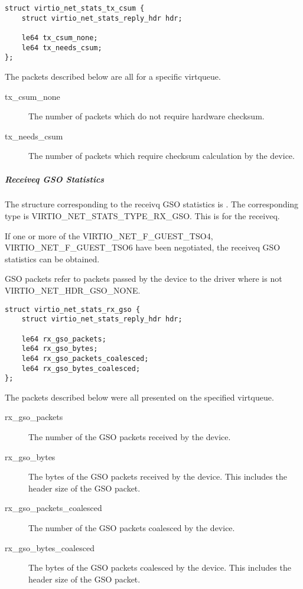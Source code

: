 \begin{lstlisting}
struct virtio_net_stats_tx_csum {
    struct virtio_net_stats_reply_hdr hdr;

    le64 tx_csum_none;
    le64 tx_needs_csum;
};
\end{lstlisting}

The packets described below are all for a specific virtqueue.
\begin{description}
    \item [tx_csum_none]
        The number of packets which do not require hardware checksum.

    \item [tx_needs_csum]
        The number of packets which require checksum calculation by the device.

\end{description}

\subparagraph{Receiveq GSO Statistics}\label{sec:Device Types / Network Device / Device Operation / Control Virtqueue / Device Statistics / Receiveq GSO Statistics}

The structure corresponding to the receivq GSO statistics is
. The corresponding type is
VIRTIO_NET_STATS_TYPE_RX_GSO. This is for the receiveq.

If one or more of the VIRTIO_NET_F_GUEST_TSO4, VIRTIO_NET_F_GUEST_TSO6
have been negotiated, the receiveq GSO statistics can be obtained.

GSO packets refer to packets passed by the device to the driver where
 is not VIRTIO_NET_HDR_GSO_NONE.

\begin{lstlisting}
struct virtio_net_stats_rx_gso {
    struct virtio_net_stats_reply_hdr hdr;

    le64 rx_gso_packets;
    le64 rx_gso_bytes;
    le64 rx_gso_packets_coalesced;
    le64 rx_gso_bytes_coalesced;
};
\end{lstlisting}

The packets described below were all presented on the specified virtqueue.
\begin{description}
    \item [rx_gso_packets]
        The number of the GSO packets received by the device.

    \item [rx_gso_bytes]
        The bytes of the GSO packets received by the device.
        This includes the header size of the GSO packet.

    \item [rx_gso_packets_coalesced]
        The number of the GSO packets coalesced by the device.

    \item [rx_gso_bytes_coalesced]
        The bytes of the GSO packets coalesced by the device.
        This includes the header size of the GSO packet.
\end{description}

